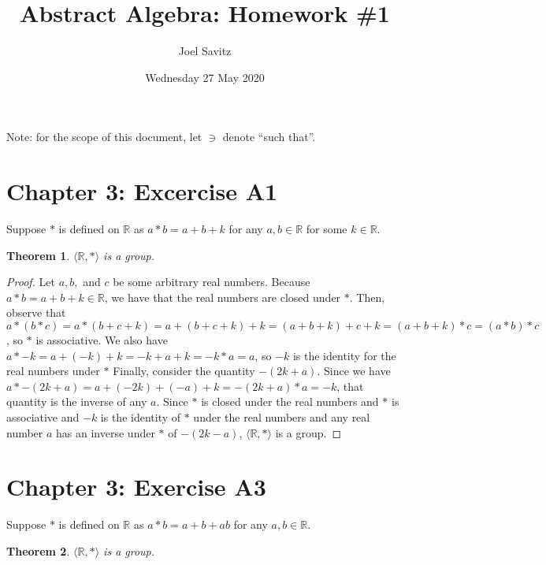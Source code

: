 \documentclass[12pt]{article}
\title{Abstract Algebra: Homework \#1}
\date{Wednesday 27 May 2020}
\author{Joel Savitz}
\newcommand{\reals}{\mathbb{R}}
\newtheorem{thm}{Theorem}
\begin{document}
\maketitle

Note: for the scope of this document, let $\ni$ denote ``such that''.

\section{Chapter 3: Excercise A1}

Suppose $*$ is defined on $\reals$ as $a * b = a + b + k$ for any $a,b \in \reals$ for some $k \in \reals$.

\begin{thm}
	$\langle \reals, * \rangle$ is a group.
\end{thm}

\begin{proof}
	Let $a,b,$ and $c$ be some arbitrary real numbers.
	Because $a * b = a + b + k \in \reals$, we have that the real numbers are closed under $*$.
	Then, observe that $a * (b * c)  = a * (b + c + k) = a + (b + c + k) + k = (a + b + k) + c + k = (a + b + k) * c = (a * b) * c$, so $*$ is associative.
	We also have $a * -k = a + (-k) + k = -k + a + k = -k * a = a$, so $-k$ is the identity for the real numbers under $*$
	Finally, consider the quantity $-(2k+a)$. Since we have $a * -(2k+a) = a + (-2k) +  (-a) + k = -(2k+a) * a = -k$, that quantity is the inverse of any $a$.
	Since $*$ is closed under the real numbers and $*$ is associative and $-k$ is the identity of $*$ under the real numbers and any real number $a$ has an inverse under $*$ of $-(2k-a)$, $\langle \reals, * \rangle$ is a group.
\end{proof}

\section{Chapter 3: Exercise A3}

Suppose $*$ is defined on $\reals$ as $a * b = a + b + ab$ for any $a,b \in \reals$.

\begin{thm}
	$\langle \reals, * \rangle$ is a group.
\end{thm}
\end{document}
